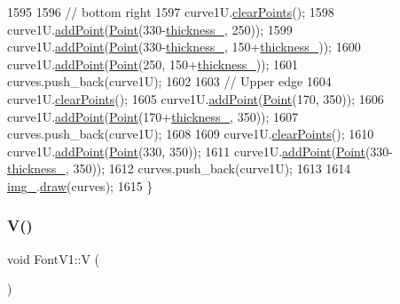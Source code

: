 \begin{DoxyCode}
1595 
1596     \textcolor{comment}{// bottom right}
1597     curve1U.\mbox{\hyperlink{class_bezier_curve_a0ba8ce66d5af5971ae6a1b506029728e}{clearPoints}}();
1598     curve1U.\mbox{\hyperlink{class_bezier_curve_a38d16c18b36ae45619b05e26e226cf34}{addPoint}}(\mbox{\hyperlink{class_point}{Point}}(330-\mbox{\hyperlink{class_font_v1_aed8040e76be9a52833627b92f0fb4e5f}{thickness\_}}, 250));
1599     curve1U.\mbox{\hyperlink{class_bezier_curve_a38d16c18b36ae45619b05e26e226cf34}{addPoint}}(\mbox{\hyperlink{class_point}{Point}}(330-\mbox{\hyperlink{class_font_v1_aed8040e76be9a52833627b92f0fb4e5f}{thickness\_}}, 150+\mbox{\hyperlink{class_font_v1_aed8040e76be9a52833627b92f0fb4e5f}{thickness\_}}));
1600     curve1U.\mbox{\hyperlink{class_bezier_curve_a38d16c18b36ae45619b05e26e226cf34}{addPoint}}(\mbox{\hyperlink{class_point}{Point}}(250, 150+\mbox{\hyperlink{class_font_v1_aed8040e76be9a52833627b92f0fb4e5f}{thickness\_}}));
1601     curves.push\_back(curve1U);
1602 
1603     \textcolor{comment}{// Upper edge}
1604     curve1U.\mbox{\hyperlink{class_bezier_curve_a0ba8ce66d5af5971ae6a1b506029728e}{clearPoints}}();
1605     curve1U.\mbox{\hyperlink{class_bezier_curve_a38d16c18b36ae45619b05e26e226cf34}{addPoint}}(\mbox{\hyperlink{class_point}{Point}}(170, 350));
1606     curve1U.\mbox{\hyperlink{class_bezier_curve_a38d16c18b36ae45619b05e26e226cf34}{addPoint}}(\mbox{\hyperlink{class_point}{Point}}(170+\mbox{\hyperlink{class_font_v1_aed8040e76be9a52833627b92f0fb4e5f}{thickness\_}}, 350));
1607     curves.push\_back(curve1U);
1608 
1609     curve1U.\mbox{\hyperlink{class_bezier_curve_a0ba8ce66d5af5971ae6a1b506029728e}{clearPoints}}();
1610     curve1U.\mbox{\hyperlink{class_bezier_curve_a38d16c18b36ae45619b05e26e226cf34}{addPoint}}(\mbox{\hyperlink{class_point}{Point}}(330, 350));
1611     curve1U.\mbox{\hyperlink{class_bezier_curve_a38d16c18b36ae45619b05e26e226cf34}{addPoint}}(\mbox{\hyperlink{class_point}{Point}}(330-\mbox{\hyperlink{class_font_v1_aed8040e76be9a52833627b92f0fb4e5f}{thickness\_}}, 350));
1612     curves.push\_back(curve1U);
1613 
1614     \mbox{\hyperlink{class_font_v1_a00569e3e3c4b70f437b63f396f735fb0}{img\_}}.\mbox{\hyperlink{class_image_a8d162f3cab956131d58708c09aa560b0}{draw}}(curves);
1615 \}
\end{DoxyCode}
\mbox{\label{class_font_v1_aa5937063bd49c25ccd8993d375926fb7}} 
\subsubsection{\texorpdfstring{V()}{V()}}
{\footnotesize\ttfamily void Font\+V1\+::V (\begin{DoxyParamCaption}{ }\end{DoxyParamCaption})}




